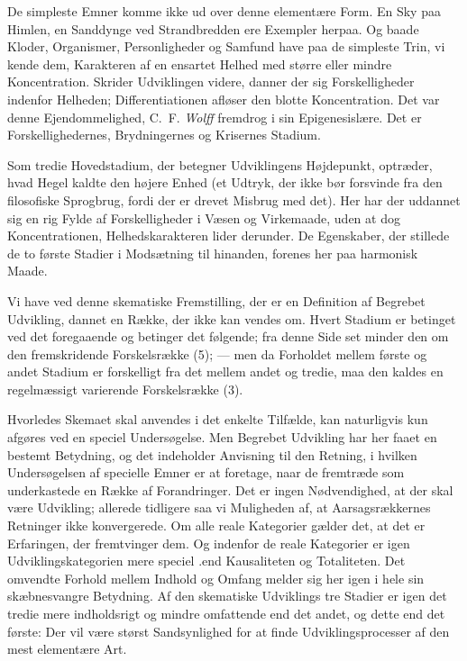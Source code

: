 \documentclass[12pt,a4paper]{book}
\newcommand{\apage}[1]{\marginnote{\footnotesize\textit{[#1]}}}
\begin{document}
De simpleste Emner komme ikke ud over denne elementære Form. En Sky paa Himlen, en
Sanddynge ved Strandbredden ere Exempler herpaa. Og baade Kloder, Organismer,
Personligheder og Samfund have paa de simpleste Trin, vi kende dem, Karakteren af
en ensartet Helhed med større eller mindre Koncentration. Skrider Udviklingen
videre, danner der sig Forskelligheder indenfor Helheden; Differentiationen
afløser den blotte Koncentration. Det var denne Ejendommelighed, C.\ F.
\emph{Wolff} fremdrog i sin Epigenesislære. Det er Forskellighedernes,
Brydningernes og Krisernes Stadium.

Som tredie Hovedstadium, der betegner Udviklingens Højdepunkt, optræder, hvad
Hegel kaldte den højere Enhed (et Udtryk, der ikke bør forsvinde fra den
filosofiske Sprogbrug, fordi der er drevet Misbrug med det). Her har der uddannet
sig en rig Fylde af Forskelligheder i Væsen og Virkemaade, uden at dog
Koncentrationen, Helhedskarakteren lider derunder. De Egenskaber, der stillede de
to første Stadier i Modsætning til hinanden, forenes her paa harmonisk Maade.

Vi have ved denne skematiske Fremstilling, der er en Definition af Begrebet
Udvikling, dannet en Række, der ikke kan vendes om. Hvert Stadium er betinget ved
det foregaaende og betinger det følgende; fra denne Side set minder \apage{234} den om den
fremskridende Forskelsrække (5); --- men da Forholdet mellem første og andet
Stadium er forskelligt fra det mellem andet og tredie, maa den kaldes en
regelmæssigt varierende Forskelsrække (3).

Hvorledes Skemaet skal anvendes i det enkelte Tilfælde, kan naturligvis kun
afgøres ved en speciel Undersøgelse. Men Begrebet Udvikling har her faaet en
bestemt Betydning, og det indeholder Anvisning til den Retning, i hvilken
Undersøgelsen af specielle Emner er at foretage, naar de fremtræde som
underkastede en Række af Forandringer. Det er ingen Nødvendighed, at der skal være
Udvikling; allerede tidligere saa vi Muligheden af, at Aarsagsrækkernes Retninger
ikke konvergerede. Om alle reale Kategorier gælder det, at det er Erfaringen, der
fremtvinger dem. Og indenfor de reale Kategorier er igen Udviklingskategorien mere speciel .end Kausaliteten og Totaliteten. Det omvendte Forhold mellem Indhold og
Omfang melder sig her igen i hele sin skæbnesvangre Betydning. Af den skematiske
Udviklings tre Stadier er igen det tredie mere indholdsrigt og mindre omfattende
end det andet, og dette end det første: Der vil være størst Sandsynlighed for at
finde Udviklingsprocesser af den mest elementære Art.
\end{document}
